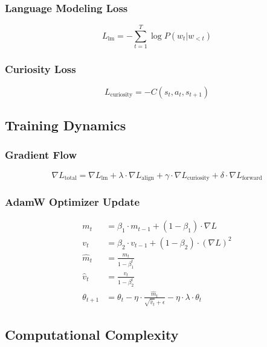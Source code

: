\documentclass{IEEEtran}
\begin{document}
\subsubsection{Language Modeling Loss}

\begin{equation}
L_{\text{lm}} = -\sum_{t=1}^T \log P(w_t | w_{<t})
\end{equation}

\subsubsection{Curiosity Loss}

\begin{equation}
L_{\text{curiosity}} = -C(s_t, a_t, s_{t+1})
\end{equation}

\subsection{Training Dynamics}

\subsubsection{Gradient Flow}

\begin{equation}
\nabla L_{\text{total}} = \nabla L_{\text{lm}} + \lambda \cdot \nabla L_{\text{align}} + \gamma \cdot \nabla L_{\text{curiosity}} + \delta \cdot \nabla L_{\text{forward}}
\end{equation}

\subsubsection{AdamW Optimizer Update}

\begin{align}
m_t &= \beta_1 \cdot m_{t-1} + (1 - \beta_1) \cdot \nabla L \\
v_t &= \beta_2 \cdot v_{t-1} + (1 - \beta_2) \cdot (\nabla L)^2 \\
\hat{m}_t &= \frac{m_t}{1 - \beta_1^t} \\
\hat{v}_t &= \frac{v_t}{1 - \beta_2^t} \\
\theta_{t+1} &= \theta_t - \eta \cdot \frac{\hat{m}_t}{\sqrt{\hat{v}_t} + \epsilon} - \eta \cdot \lambda \cdot \theta_t
\end{align}

\subsection{Computational Complexity}
\end{document}
